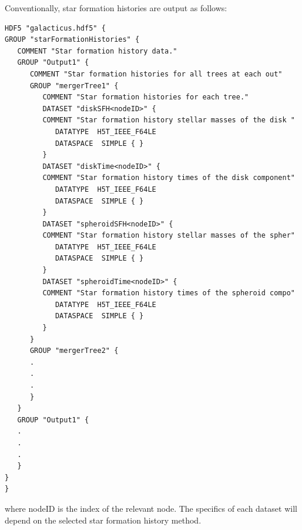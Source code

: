 Conventionally, star formation histories are output as follows:
\begin{verbatim}
HDF5 "galacticus.hdf5" {
GROUP "starFormationHistories" {
   COMMENT "Star formation history data."
   GROUP "Output1" {
      COMMENT "Star formation histories for all trees at each out"
      GROUP "mergerTree1" {
         COMMENT "Star formation histories for each tree."
         DATASET "diskSFH<nodeID>" {
         COMMENT "Star formation history stellar masses of the disk "
            DATATYPE  H5T_IEEE_F64LE
            DATASPACE  SIMPLE { }
         }
         DATASET "diskTime<nodeID>" {
         COMMENT "Star formation history times of the disk component"
            DATATYPE  H5T_IEEE_F64LE
            DATASPACE  SIMPLE { }
         }
         DATASET "spheroidSFH<nodeID>" {
         COMMENT "Star formation history stellar masses of the spher"
            DATATYPE  H5T_IEEE_F64LE
            DATASPACE  SIMPLE { }
         }
         DATASET "spheroidTime<nodeID>" {
         COMMENT "Star formation history times of the spheroid compo"
            DATATYPE  H5T_IEEE_F64LE
            DATASPACE  SIMPLE { }
         }
      }
      GROUP "mergerTree2" {
      .
      .
      .
      }
   }
   GROUP "Output1" {
   .
   .
   .
   }
}
}
\end{verbatim}
where {\normalfont \ttfamily nodeID} is the index of the relevant node. The specifics of each dataset will depend on the selected star formation history method.

